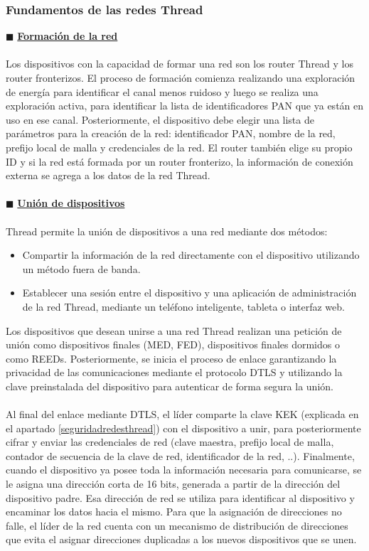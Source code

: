 \subsubsection{Fundamentos de las redes Thread} %
$\blacksquare$ {\underline{\textbf{Formación de la red}}} %
\\\\Los dispositivos con la capacidad de formar una red son los router Thread y los router fronterizos. El proceso de formación comienza realizando una exploración de energía para identificar el canal menos ruidoso y luego se realiza una exploración activa, para identificar la lista de identificadores PAN que ya están en uso en ese canal. Posteriormente, el dispositivo debe elegir una lista de parámetros para la creación de la red: identificador PAN, nombre de la red, prefijo local de malla y credenciales de la red. El router también elige su propio ID y si la red está formada por un router fronterizo, la información de conexión externa se agrega a los datos de la red Thread.
\vspace{0.3cm}
\\\\$\blacksquare$ {\underline{\textbf{Unión de dispositivos}}} %
\\\\Thread permite la unión de dispositivos a una red mediante dos métodos:
\begin{itemize}
\item Compartir la información de la red directamente con el dispositivo utilizando un método fuera de banda.
\item Establecer una sesión entre el dispositivo y una aplicación de administración de la red Thread, mediante un teléfono inteligente, tableta o interfaz web.
\end{itemize}
\vspace{0.25cm}
Los dispositivos que desean unirse a una red Thread realizan una petición de unión como dispositivos finales (MED, FED), dispositivos finales dormidos o como REEDs. Posteriormente, se inicia el proceso de enlace garantizando la privacidad de las comunicaciones mediante el protocolo DTLS y utilizando la clave preinstalada del dispositivo para autenticar de forma segura la unión.
\\\\Al final del enlace mediante DTLS, el líder comparte la clave KEK (explicada en el apartado \ref{seguridadredesthread}) con el dispositivo a unir, para posteriormente cifrar y enviar las credenciales de red (clave maestra, prefijo local de malla, contador de secuencia de la clave de red, identificador de la red, ..). Finalmente, cuando el dispositivo ya posee toda la información necesaria para comunicarse, se le asigna una dirección corta de 16 bits, generada a partir de la dirección del dispositivo padre. Esa dirección de red se utiliza para identificar al dispositivo y encaminar los datos hacia el mismo. Para que la asignación de direcciones no falle, el líder de la red cuenta con un mecanismo de distribución de direcciones que evita el asignar direcciones duplicadas a los nuevos dispositivos que se unen.
